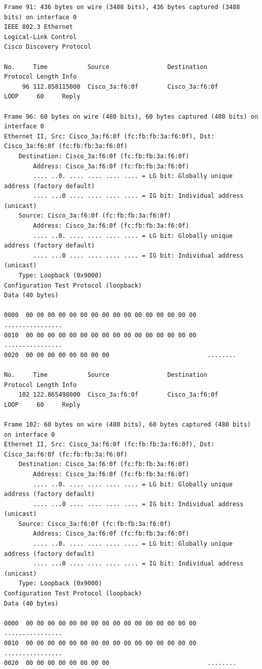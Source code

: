 \documentclass[a4paper,11pt]{article}
\begin{document}
\begin{lstlisting}
Frame 91: 436 bytes on wire (3488 bits), 436 bytes captured (3488 bits) on interface 0
IEEE 802.3 Ethernet 
Logical-Link Control
Cisco Discovery Protocol

No.     Time           Source                Destination           Protocol Length Info
     96 112.858115000  Cisco_3a:f6:0f        Cisco_3a:f6:0f        LOOP     60     Reply

Frame 96: 60 bytes on wire (480 bits), 60 bytes captured (480 bits) on interface 0
Ethernet II, Src: Cisco_3a:f6:0f (fc:fb:fb:3a:f6:0f), Dst: Cisco_3a:f6:0f (fc:fb:fb:3a:f6:0f)
    Destination: Cisco_3a:f6:0f (fc:fb:fb:3a:f6:0f)
        Address: Cisco_3a:f6:0f (fc:fb:fb:3a:f6:0f)
        .... ..0. .... .... .... .... = LG bit: Globally unique address (factory default)
        .... ...0 .... .... .... .... = IG bit: Individual address (unicast)
    Source: Cisco_3a:f6:0f (fc:fb:fb:3a:f6:0f)
        Address: Cisco_3a:f6:0f (fc:fb:fb:3a:f6:0f)
        .... ..0. .... .... .... .... = LG bit: Globally unique address (factory default)
        .... ...0 .... .... .... .... = IG bit: Individual address (unicast)
    Type: Loopback (0x9000)
Configuration Test Protocol (loopback)
Data (40 bytes)

0000  00 00 00 00 00 00 00 00 00 00 00 00 00 00 00 00   ................
0010  00 00 00 00 00 00 00 00 00 00 00 00 00 00 00 00   ................
0020  00 00 00 00 00 00 00 00                           ........

No.     Time           Source                Destination           Protocol Length Info
    102 122.865498000  Cisco_3a:f6:0f        Cisco_3a:f6:0f        LOOP     60     Reply

Frame 102: 60 bytes on wire (480 bits), 60 bytes captured (480 bits) on interface 0
Ethernet II, Src: Cisco_3a:f6:0f (fc:fb:fb:3a:f6:0f), Dst: Cisco_3a:f6:0f (fc:fb:fb:3a:f6:0f)
    Destination: Cisco_3a:f6:0f (fc:fb:fb:3a:f6:0f)
        Address: Cisco_3a:f6:0f (fc:fb:fb:3a:f6:0f)
        .... ..0. .... .... .... .... = LG bit: Globally unique address (factory default)
        .... ...0 .... .... .... .... = IG bit: Individual address (unicast)
    Source: Cisco_3a:f6:0f (fc:fb:fb:3a:f6:0f)
        Address: Cisco_3a:f6:0f (fc:fb:fb:3a:f6:0f)
        .... ..0. .... .... .... .... = LG bit: Globally unique address (factory default)
        .... ...0 .... .... .... .... = IG bit: Individual address (unicast)
    Type: Loopback (0x9000)
Configuration Test Protocol (loopback)
Data (40 bytes)

0000  00 00 00 00 00 00 00 00 00 00 00 00 00 00 00 00   ................
0010  00 00 00 00 00 00 00 00 00 00 00 00 00 00 00 00   ................
0020  00 00 00 00 00 00 00 00                           ........


\end{lstlisting}
\end{document}
